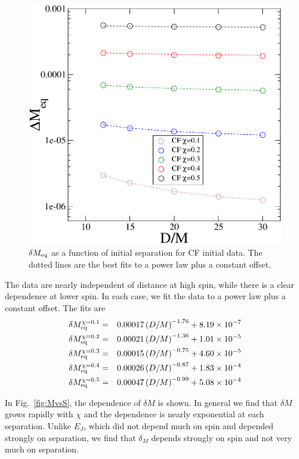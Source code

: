 \begin{figure}[!htbp]
\includegraphics[scale=0.95]{chap5/MvsD2}
\caption{$\delta M_{\rm eq}$ as a function of initial separation for
  CF initial data. The dotted lines are the best fits to a power law
  plus a constant offset.}
\label{fig:MvsD}
\end{figure}

The data are nearly independent of distance at high spin, while there
is a clear dependence at lower spin. In each case, we fit the data to
a power law plus a constant offset. The fits are
\begin{eqnarray*}
\delta M_{\rm eq}^{\chi = 0.1} &=&
0.00017\left(D/M\right)^{-1.76}+8.19\times 10^{-7} \\
\delta M_{\rm eq}^{\chi = 0.2} &=&
0.00021\left(D/M\right)^{-1.36}+1.01\times 10^{-5} \\
\delta M_{\rm eq}^{\chi = 0.3} &=&
0.00015\left(D/M\right)^{-0.75}+4.60\times 10^{-5} \\
\delta M_{\rm eq}^{\chi = 0.4} &=&
0.00026\left(D/M\right)^{-0.87}+1.83\times 10^{-4} \\
\delta M_{\rm eq}^{\chi = 0.5} &=&
0.00047\left(D/M\right)^{-0.99}+5.08\times 10^{-4} 
\end{eqnarray*}

In Fig.~\ref{fig:MvsS}, the dependence of $\delta M$ is
shown. In general we find that $\delta M$ grows rapidly with
$\chi$ and the dependence is nearly exponential at each
separation. Unlike $E_J$, which did not depend much on spin and
depended strongly on separation, we find that $\delta_M$ depends
strongly on spin and not very much on separation. 

